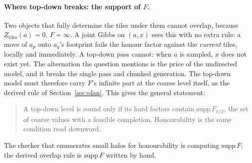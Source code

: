 \documentclass[11pt]{article}
\newcommand{\1}{\mathds{1}}
\begin{document}
\paragraph{Where top-down breaks: the support of $F$.} Two objects that fully
determine the tiles under them cannot overlap, because $Z_{\text{tiles}}(a) = 0$,
$F = \infty$. A joint Gibbs on $(a, x)$ sees this with no extra rule: a move of
$a_p$ onto $a_q$'s footprint fails the honour factor against the \emph{current}
tiles, locally and immediately. A top-down pass cannot: when $a$ is sampled,
$x$ does not exist yet. The alternation the question mentions is the price of
the undirected model, and it breaks the single pass and chunked generation. The
top-down model must therefore carry $F$'s infinite part at the coarse level
itself, as the derived rule of Section~\ref{sec:plan}. This gives the general
statement:
\begin{quote}
  A top-down level is sound only if its hard factors contain $\mathrm{supp}\,F_{h/2}$,
  the set of coarse values with a feasible completion. Honourability is the
  same condition read downward.
\end{quote}
The checker that enumerates small halos for honourability is computing
$\mathrm{supp}\,F$; the derived overlap rule is $\mathrm{supp}\,F$ written by hand.
\end{document}
